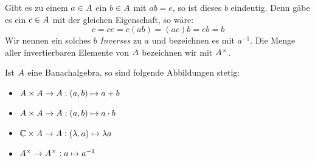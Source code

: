 \begin{bem}
Gibt es zu einem $a \in A$ ein $b \in A$ mit $ab = e$, so ist dieses $b$ eindeutig. Denn gäbe es ein $c \in A$ mit der gleichen Eigenschaft, so wäre:
	\[c = ce = c(ab) = (ac)b = eb = b\]
Wir nennen ein solches $b$ \emph{Inverses} zu $a$ und bezeichnen es mit $a^{-1}$. Die Menge aller invertierbaren Elemente von $A$ bezeichnen wir mit $A^\times$.
\end{bem}

\begin{lemma}\label{lemma:BAlg-Eigenschaften}
Ist $A$ eine Banachalgebra, so sind folgende Abbildungen stetig:
\begin{itemize}
	\item $A \times A \to A: (a,b) \mapsto a+b$
	\item $A \times A \to A: (a,b) \mapsto a\cdot b$	
	\item $\mathbb{C} \times A \to A: (\lambda,a) \mapsto \lambda a$
	\item $A^\times \to A^\times: a \mapsto a^{-1}$
\end{itemize}
\end{lemma}


